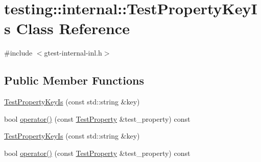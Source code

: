 \hypertarget{classtesting_1_1internal_1_1_test_property_key_is}{\section{testing\-:\-:internal\-:\-:Test\-Property\-Key\-Is Class Reference}
\label{classtesting_1_1internal_1_1_test_property_key_is}
}


{\ttfamily \#include $<$gtest-\/internal-\/inl.\-h$>$}

\subsection*{Public Member Functions}
\begin{DoxyCompactItemize}
\item 
\hyperlink{classtesting_1_1internal_1_1_test_property_key_is_a509ed1271caa1032e40c5d811b3da385}{Test\-Property\-Key\-Is} (const std\-::string \&key)
\item 
bool \hyperlink{classtesting_1_1internal_1_1_test_property_key_is_aed5dfb89159b3a071a8f3521fa1f8eb0}{operator()} (const \hyperlink{classtesting_1_1_test_property}{Test\-Property} \&test\-\_\-property) const 
\item 
\hyperlink{classtesting_1_1internal_1_1_test_property_key_is_a509ed1271caa1032e40c5d811b3da385}{Test\-Property\-Key\-Is} (const std\-::string \&key)
\item 
bool \hyperlink{classtesting_1_1internal_1_1_test_property_key_is_aed5dfb89159b3a071a8f3521fa1f8eb0}{operator()} (const \hyperlink{classtesting_1_1_test_property}{Test\-Property} \&test\-\_\-property) const 
\end{DoxyCompactItemize}


